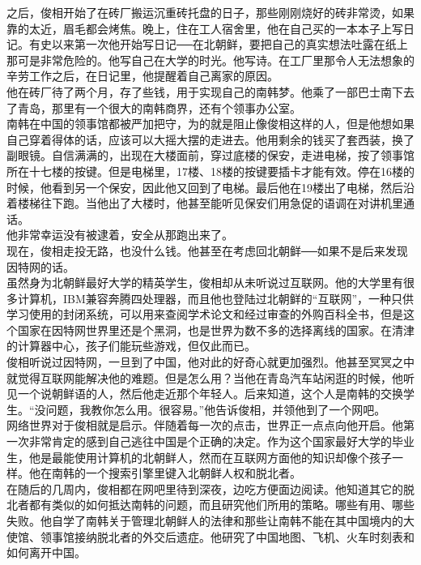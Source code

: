 之后，俊相开始了在砖厂搬运沉重砖托盘的日子，那些刚刚烧好的砖非常烫，如果靠的太近，眉毛都会烤焦。晚上，住在工人宿舍里，他在自己买的一本本子上写日记。有史以来第一次他开始写日记──在北朝鲜，要把自己的真实想法吐露在纸上那可是非常危险的。他写自己在大学的时光。他写诗。在工厂里那令人无法想象的辛劳工作之后，在日记里，他提醒着自己离家的原因。\\

他在砖厂待了两个月，存了些钱，用于实现自己的南韩梦。他乘了一部巴士南下去了青岛，那里有一个很大的南韩商界，还有个领事办公室。\\

南韩在中国的领事馆都被严加把守，为的就是阻止像俊相这样的人，但是他想如果自己穿着得体的话，应该可以大摇大摆的走进去。他用剩余的钱买了套西装，换了副眼镜。自信满满的，出现在大楼面前，穿过底楼的保安，走进电梯，按了领事馆所在十七楼的按键。但是电梯里，17楼、18楼的按键要插卡才能有效。停在16楼的时候，他看到另一个保安，因此他又回到了电梯。最后他在19楼出了电梯，然后沿着楼梯往下跑。当他出了大楼时，他甚至能听见保安们用急促的语调在对讲机里通话。\\

他非常幸运没有被逮着，安全从那跑出来了。\\

现在，俊相走投无路，也没什么钱。他甚至在考虑回北朝鲜──如果不是后来发现因特网的话。\\

虽然身为北朝鲜最好大学的精英学生，俊相却从未听说过互联网。他的大学里有很多计算机，IBM兼容奔腾四处理器，而且他也登陆过北朝鲜的“互联网”，一种只供学习使用的封闭系统，可以用来查阅学术论文和经过审查的外购百科全书，但是这个国家在因特网世界里还是个黑洞，也是世界为数不多的选择离线的国家。在清津的计算器中心，孩子们能玩些游戏，但仅此而已。\\

俊相听说过因特网，一旦到了中国，他对此的好奇心就更加强烈。他甚至冥冥之中就觉得互联网能解决他的难题。但是怎么用？当他在青岛汽车站闲逛的时候，他听见一个说朝鲜语的人，然后他走近那个年轻人。后来知道，这个人是南韩的交换学生。“没问题，我教你怎么用。很容易。”他告诉俊相，并领他到了一个网吧。\\

网络世界对于俊相就是启示。伴随着每一次的点击，世界正一点点向他开启。他第一次非常肯定的感到自己逃往中国是个正确的决定。作为这个国家最好大学的毕业生，他是最能使用计算机的北朝鲜人，然而在互联网方面他的知识却像个孩子一样。他在南韩的一个搜索引擎里键入北朝鲜人权和脱北者。\\

在随后的几周内，俊相都在网吧里待到深夜，边吃方便面边阅读。他知道其它的脱北者都有类似的如何抵达南韩的问题，而且研究他们所用的策略。哪些有用、哪些失败。他自学了南韩关于管理北朝鲜人的法律和那些让南韩不能在其中国境内的大使馆、领事馆接纳脱北者的外交后遗症。他研究了中国地图、飞机、火车时刻表和如何离开中国。\\


